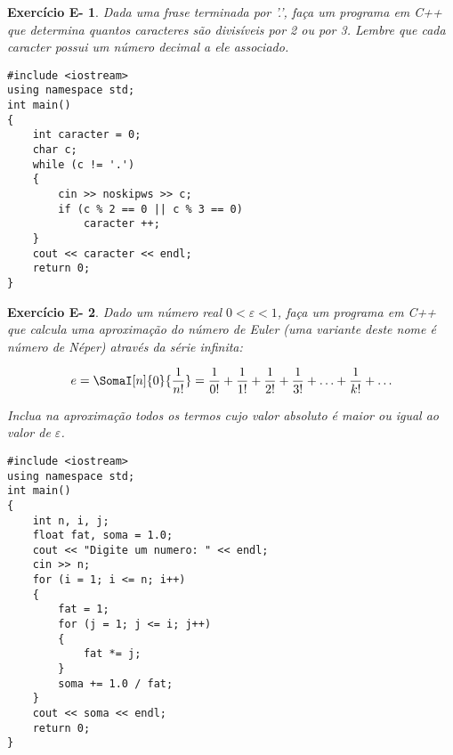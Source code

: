 \documentclass[a4paper]{article}
\newtheorem{eex}{Exerc\'icio E-}
\begin{document}
\begin{eex}
Dada uma frase terminada por ’.’, faça um programa em C++ que determina quantos caracteres são divisíveis por 2 ou por 3.
Lembre que cada caracter possui um número decimal a ele associado.
\end{eex}

\begin{sol}
\begin{lstlisting}
#include <iostream>
using namespace std;
int main()
{
    int caracter = 0;
    char c;
    while (c != '.')
    {
        cin >> noskipws >> c;
        if (c % 2 == 0 || c % 3 == 0)
            caracter ++;
    }
    cout << caracter << endl;
    return 0;
}
\end{lstlisting}
\end{sol}

\begin{eex}
Dado um número real $0 < \varepsilon < 1$, faça um programa em C++ que calcula uma aproximação do número de Euler (uma variante deste nome é número de Néper) através da série infinita:

\[
e = \SomaI[n]{0}{\frac{1}{n!}} = \frac{1}{{0!}} + \frac{1}{{1!}} + \frac{1}{{2!}} + \frac{1}{{3!}} +  \ldots  + \frac{1}{{k!}} +  \ldots 
\]

Inclua na aproximação todos os termos cujo valor absoluto é maior ou igual ao valor de $\varepsilon$.
\end{eex}

\begin{sol}
\begin{lstlisting}
#include <iostream>
using namespace std;
int main()
{
    int n, i, j;
    float fat, soma = 1.0;
    cout << "Digite um numero: " << endl;
    cin >> n;
    for (i = 1; i <= n; i++)
    {
        fat = 1;
        for (j = 1; j <= i; j++)
        {
            fat *= j;
        }
        soma += 1.0 / fat;
    }
    cout << soma << endl;
    return 0;
}
\end{lstlisting}
\end{sol}
\end{document}
